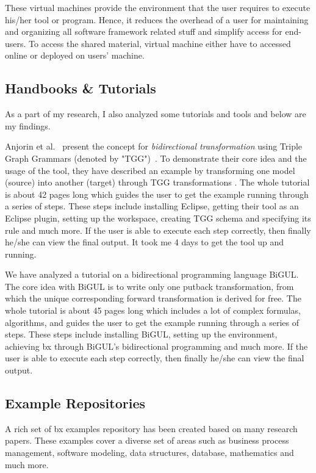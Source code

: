 These virtual machines provide the environment that the user requires to execute his/her tool or program. Hence, it reduces the overhead of a user for maintaining and organizing all software framework related stuff and simplify access for end-users. To access the shared material, virtual machine either have to accessed online or deployed on users' machine.

\subsection{Handbooks \& Tutorials}\label{subsec:handbook}
As a part of my research, I also analyzed some tutorials and tools and below are my findings.

Anjorin et al.~\cite{emoflon-part4} present the concept for \textit{bidirectional transformation} using Triple Graph Grammars (denoted by "TGG")~\cite{tgg}. To demonstrate their core idea and the usage of the tool, they have described an example by transforming one model (source) into another (target) through TGG transformations \cite{tgg}\cite{bx-tgg}. The whole tutorial is about 42 pages long which guides the user to get the example running through a series of steps. These steps include installing \ac{Eclipse}, getting their tool as an Eclipse plugin, setting up the workspace, creating TGG schema and specifying its rule and much more. If the user is able to execute each step correctly, then finally he/she can view the final output. It took me 4 days to get the tool up and running.

We have analyzed a tutorial\cite{bigul-tutorial} on a bidirectional programming language BiGUL\cite{bigul}. The core idea with BiGUL is to write only one putback transformation, from which the unique corresponding forward transformation is derived for free. The whole tutorial is about 45 pages long which includes a lot of complex formulas, algorithms, and guides the user to get the example running through a series of steps. These steps include installing BiGUL, setting up the environment, achieving bx through BiGUL's bidirectional programming and much more. If the user is able to execute each step correctly, then finally he/she can view the final output. 

\subsection{Example Repositories}\label{subsec:examplerep}
A rich set of bx examples repository \cite{bx-examples} has been created based on many research papers. These examples cover a diverse set of areas such as business process management, software modeling, data structures, database, mathematics and much more.

